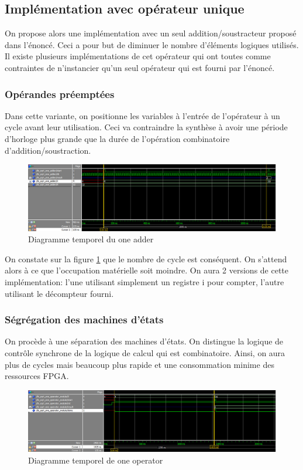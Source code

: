 \documentclass[12pt,a4paper]{article}
\begin{document}
%

\subsection{Implémentation avec opérateur unique}
On propose alors une implémentation avec un seul addition/soustracteur proposé dans l'énoncé. Ceci a pour but de diminuer le nombre d'éléments logiques utilisés. Il existe plusieurs implémentations de cet opérateur qui ont toutes comme contraintes de n'instancier qu'un seul opérateur qui est fourni par l'énoncé.

\subsubsection{Opérandes préemptées}
Dans cette variante, on positionne les variables à l'entrée de l'opérateur à un cycle avant leur utilisation. Ceci va contraindre la synthèse à avoir une période d'horloge plus grande que la durée de l'opération combinatoire d'addition/soustraction.
\begin{figure}[H]
	\centering
	\includegraphics[width=\linewidth]{figures/one_adder}
	\caption{Diagramme temporel du one adder}
	\label{fig:one_adder}
\end{figure}
On constate sur la figure \ref{fig:one_adder} que le nombre de cycle est conséquent. On s'attend alors à ce que l'occupation matérielle soit moindre. On aura 2 versions de cette implémentation: l'une utilisant simplement un registre i pour compter, l'autre utilisant le décompteur fourni.
%

\subsubsection{Ségrégation des machines d'états} 
On procède à une séparation des machines d'états. On distingue la logique de contrôle synchrone de la logique de calcul qui est combinatoire. Ainsi, on aura plus de cycles mais beaucoup plus rapide et une consommation minime des ressources FPGA.
\begin{figure}[H]
	\centering
	\includegraphics[width=\linewidth]{figures/one_operator}
	\caption{Diagramme temporel de one operator}
	\label{fig:one_operator}
\end{figure}
\end{document}
